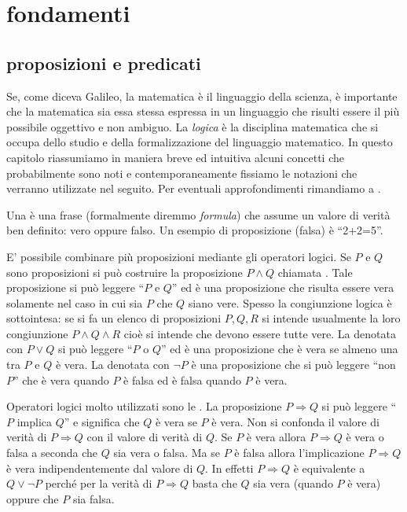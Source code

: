 \chapter{fondamenti}

\section{proposizioni e predicati}

Se, come diceva Galileo, la matematica è il linguaggio della scienza,
è importante che la matematica sia essa stessa espressa in un linguaggio
che risulti essere il più possibile oggettivo e non ambiguo.
La \emph{logica} è la disciplina matematica che si occupa
dello studio e della formalizzazione del linguaggio matematico.
In questo capitolo riassumiamo in maniera breve ed intuitiva
alcuni concetti che probabilmente sono noti e contemporaneamente
fissiamo le notazioni che verranno utilizzate nel seguito.
Per eventuali approfondimenti rimandiamo a \cite{appunti_logica}.

Una 
è una frase (formalmente diremmo \emph{formula})
che assume un valore di verità ben
definito: vero oppure falso.
Un esempio di proposizione (falsa) è ``2+2=5''.

E' possibile combinare più proposizioni mediante
gli operatori logici. Se $P$ e $Q$ sono proposizioni
si può costruire la proposizione $P \land Q$
chiamata .
Tale proposizione
si può leggere ``$P$ e $Q$'' ed è una proposizione
che risulta essere vera solamente nel caso in cui sia
$P$ che $Q$ siano vere.
Spesso la congiunzione logica è sottointesa:
se si fa un elenco di proposizioni $P,Q,R$ 
si intende usualmente la loro congiunzione $P \land Q \land R$
cioè si intende che devono essere tutte vere.
La  denotata
con $P \lor Q$
si può leggere ``$P$ o $Q$'' ed è una proposizione che
è vera se almeno una tra $P$ e $Q$ è vera.
La  denotata con $\lnot P$ è una
proposizione che si può leggere ``non $P$'' che
è vera quando $P$ è falsa ed è falsa quando $P$ è vera.

Operatori logici molto utilizzati sono le .
La proposizione $P\Rightarrow Q$ si può leggere ``$P$ implica $Q$''
e significa che $Q$ è vera se $P$ è vera. Non si confonda
il valore di verità di $P\Rightarrow Q$ con il valore di verità
di $Q$. Se $P$ è vera allora $P\Rightarrow Q$ è vera o falsa
a seconda che $Q$ sia vera o falsa. Ma se $P$ è falsa allora
l'implicazione $P\Rightarrow Q$ è vera indipendentemente dal
valore di $Q$. In effetti $P\Rightarrow Q$ è equivalente a
$Q \lor \lnot P$ perché per la verità di $P\Rightarrow Q$
basta che $Q$ sia vera (quando $P$ è vera) oppure che $P$ sia falsa.

